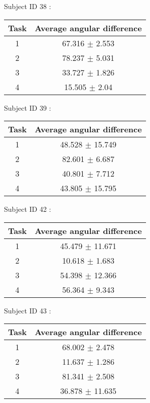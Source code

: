 \documentclass[12pt]{article}
\begin{document}
\par Subject ID  38 :
\begin{center}
\begin{tabular}{|c|c|}
\hline
 Task & Average angular difference \\ \hline
1  &  67.316 $\pm$ 2.553 \\
2  &  78.237 $\pm$ 5.031 \\
3  &  33.727 $\pm$ 1.826 \\
4  &  15.505 $\pm$ 2.04 \\
\hline
\end{tabular}
\end{center}

\par Subject ID  39 :
\begin{center}
\begin{tabular}{|c|c|}
\hline
 Task & Average angular difference \\ \hline
1  &  48.528 $\pm$ 15.749 \\
2  &  82.601 $\pm$ 6.687 \\
3  &  40.801 $\pm$ 7.712 \\
4  &  43.805 $\pm$ 15.795 \\
\hline
\end{tabular}
\end{center}

\par Subject ID  42 :
\begin{center}
\begin{tabular}{|c|c|}
\hline
 Task & Average angular difference \\ \hline
1  &  45.479 $\pm$ 11.671 \\
2  &  10.618 $\pm$ 1.683 \\
3  &  54.398 $\pm$ 12.366 \\
4  &  56.364 $\pm$ 9.343 \\
\hline
\end{tabular}
\end{center}

\par Subject ID  43 :
\begin{center}
\begin{tabular}{|c|c|}
\hline
 Task & Average angular difference \\ \hline
1  &  68.002 $\pm$ 2.478 \\
2  &  11.637 $\pm$ 1.286 \\
3  &  81.341 $\pm$ 2.508 \\
4  &  36.878 $\pm$ 11.635 \\
\hline
\end{tabular}
\end{center}
\end{document}
